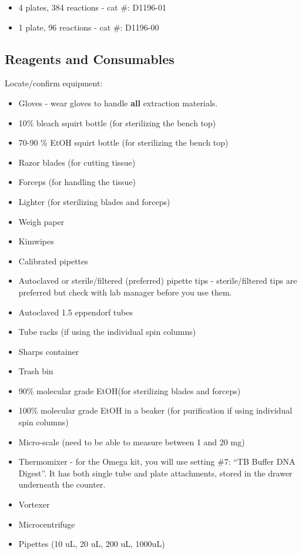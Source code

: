 \documentclass[
  letterpaper,
  DIV=11,
  numbers=noendperiod]{scrreprt}
\begin{document}
\begin{itemize}
\item
  4 plates, 384 reactions - cat \#: D1196-01
\item
  1 plate, 96 reactions - cat \#: D1196-00
\end{itemize}

\hypertarget{reagents-and-consumables}{%
\subsection*{\texorpdfstring{\textbf{Reagents and
Consumables}}{Reagents and Consumables}}\label{reagents-and-consumables}}

Locate/confirm equipment:

\begin{itemize}
\item
  Gloves - wear gloves to handle \textbf{all} extraction materials.
\item
  10\% bleach squirt bottle (for sterilizing the bench top)
\item
  70-90 \% EtOH squirt bottle (for sterilizing the bench top)
\item
  Razor blades (for cutting tissue)
\item
  Forceps (for handling the tissue)
\item
  Lighter (for sterilizing blades and forceps)
\item
  Weigh paper
\item
  Kimwipes
\item
  Calibrated pipettes
\item
  Autoclaved or sterile/filtered (preferred) pipette tips -
  sterile/filtered tips are preferred but check with lab manager before
  you use them.
\item
  Autoclaved 1.5 eppendorf tubes
\item
  Tube racks (if using the individual spin columns)
\item
  Sharps container
\item
  Trash bin
\item
  90\% molecular grade EtOH(for sterilizing blades and forceps)
\item
  100\% molecular grade EtOH in a beaker (for purification if using
  individual spin columns)
\item
  Micro-scale (need to be able to measure between 1 and 20 mg)
\item
  Thermomixer - for the Omega kit, you will use setting \#7: ``TB Buffer
  DNA Digest''. It has both single tube and plate attachments, stored in
  the drawer underneath the counter.
\item
  Vortexer
\item
  Microcentrifuge
\item
  Pipettes (10 uL, 20 uL, 200 uL, 1000uL)
\end{itemize}
\end{document}
